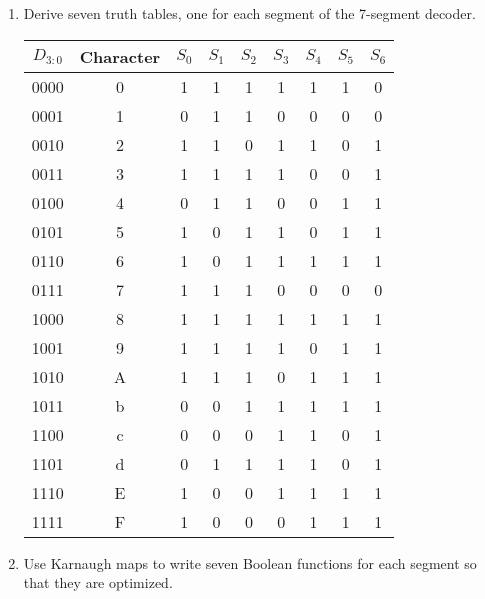 \documentclass{article}
\begin{document}
\begin{enumerate}
\item Derive seven truth tables, one for each segment of the 7-segment decoder.

\begin{table}[ht!]
\small
\centering
\begin{tabular}{c|c|ccccccc}
$D_{3:0}$& Character & $S_0$ & $S_1$ & $S_2$ & $S_3$ & $S_4$ & $S_5$ & $S_6$\\
\hline
0000 & 0 &1&1&1&1&1&1&0\\
0001 & 1 &0&1&1&0&0&0&0\\
0010 & 2 &1&1&0&1&1&0&1\\
0011 & 3 &1&1&1&1&0&0&1\\
0100 & 4 &0&1&1&0&0&1&1\\
0101 & 5 &1&0&1&1&0&1&1\\
0110 & 6 &1&0&1&1&1&1&1\\
0111 & 7 &1&1&1&0&0&0&0\\
1000 & 8 &1&1&1&1&1&1&1\\
1001 & 9 &1&1&1&1&0&1&1\\
1010 & A &1&1&1&0&1&1&1\\
1011 & b &0&0&1&1&1&1&1\\
1100 & c &0&0&0&1&1&0&1\\
1101 & d &0&1&1&1&1&0&1\\
1110 & E &1&0&0&1&1&1&1\\
1111 & F &1&0&0&0&1&1&1\\
\end{tabular}
\end{table}

\item Use Karnaugh maps to write seven Boolean functions for each segment so that they are optimized.


\end{enumerate}
\end{document}
